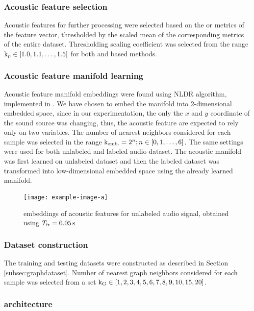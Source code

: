 \documentclass[applsci,article,submit,moreauthors,pdftex]{Definitions/mdpi}
\begin{document}
\subsubsection{Acoustic feature selection}
Acoustic features for further processing were selected based on the \rms{} or \cf{} metrics of the feature vector, thresholded by the scaled mean of the corresponding metrics of the entire dataset.
Thresholding scaling coefficient \thrmeanlvl{} was selected from the range $ \mathrm{k}_{p} \in [1.0, 1.1, \dots, 1.5] $ for both \rms{} and \cf{} based methods.

\subsubsection{Acoustic feature manifold learning}
Acoustic feature manifold embeddings were found using \isomap{} NLDR algorithm, implemented in \cite{pedregosaScikitlearnMachineLearning2011}.
We have chosen to embed the manifold into 2-dimensional embedded space, since in our experimentation, the only the $ x $ and $ y $ coordinate of the sound source was changing, thus, the acoustic feature are expected to rely only on two variables.
The number of nearest neighbors considered for each sample was selected in the range $ \mathrm{k}_{\mathrm{emb.}} = 2^n; n \in [0,1,\dots,6] $.
The same settings were used for both unlabeled and labeled audio dataset. The acoustic manifold was first learned on unlabeled dataset and then the labeled dataset was transformed into low-dimensional embedded space using the already learned manifold.

\begin{figure}
	\centering
	\texttt{[image: example-image-a]}
	\caption{\isomap{} embeddings of acoustic features for unlabeled audio signal, obtained using $ \framedur = \SI{0.05}{\s} $}
	\label{fig:example-image-a}
\end{figure}

\subsubsection{Dataset construction}
The training and testing datasets were constructed as described in Section \ref{subsec:graphdataset}. Number of nearest graph neighbors considered for each sample \gnbrs{} was selected from a set $ \mathrm{k}_{\mathrm{G}}{} \in [1, 2, 3, 4, 5, 6, 7, 8, 9, 10, 15, 20] $. 

\subsubsection{\grnn{} architecture}
\end{document}
